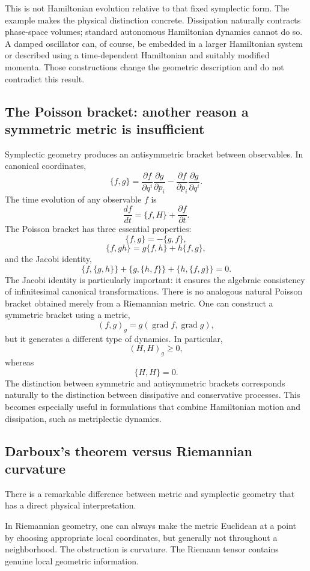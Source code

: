 This is not Hamiltonian evolution relative to that fixed symplectic form. The
example makes the physical distinction concrete. Dissipation naturally
contracts phase-space volumes; standard autonomous Hamiltonian dynamics cannot
do so. A damped oscillator can, of course, be embedded in a larger Hamiltonian
system or described using a time-dependent Hamiltonian and suitably modified
momenta. Those constructions change the geometric description and do not
contradict this result.

\subsection{The Poisson bracket: another reason a symmetric metric is
insufficient}
Symplectic geometry produces an antisymmetric bracket between observables.
In canonical coordinates,
\[
\boxed{
\{f,g\}
=
\frac{\partial f}{\partial q^i}
\frac{\partial g}{\partial p_i}
-
\frac{\partial f}{\partial p_i}
\frac{\partial g}{\partial q^i}.
}
\]
The time evolution of any observable \(f\) is
\[
\boxed{
\frac{df}{dt}=\{f,H\}+\frac{\partial f}{\partial t}.
}
\]
The Poisson bracket has three essential properties:
\[
\{f,g\}=-\{g,f\},
\]
\[
\{f,gh\}=g\{f,h\}+h\{f,g\},
\]
and the Jacobi identity,
\[
\boxed{
\{f,\{g,h\}\}
+\{g,\{h,f\}\}
+\{h,\{f,g\}\}=0.
}
\]
The Jacobi identity is particularly important: it ensures the algebraic
consistency of infinitesimal canonical transformations.
There is no analogous natural Poisson bracket obtained merely from a Riemannian
metric.
One can construct a symmetric bracket using a metric,
\[
(f,g)_g=g(\operatorname{grad}f,\operatorname{grad}g),
\]
but it generates a different type of dynamics.
In particular,
\[
(H,H)_g\geq0,
\]
whereas
\[
\{H,H\}=0.
\]
The distinction between symmetric and antisymmetric brackets corresponds
naturally to the distinction between dissipative and conservative processes.
This becomes especially useful in formulations that combine Hamiltonian motion
and dissipation, such as metriplectic dynamics.

\subsection{ Darboux's theorem versus Riemannian curvature}
There is a remarkable difference between metric and symplectic geometry that
has a direct physical interpretation.

In Riemannian geometry, one can always make the metric Euclidean at a point by
choosing appropriate local coordinates, but generally not throughout a
neighborhood.
The obstruction is curvature.
The Riemann tensor contains genuine local geometric information.


